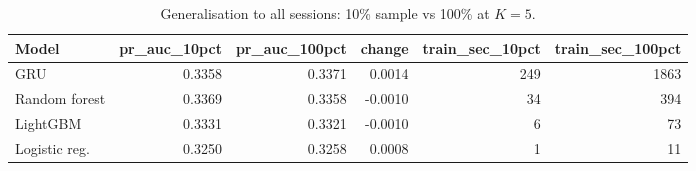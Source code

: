 \begin{table}[t]
\centering
\caption{Generalisation to all sessions: 10\% sample vs 100\% at $K=5$.}
\label{tab:scale}
\footnotesize
\begin{tabular}{lrrrrr}
\toprule
Model & pr\_auc\_10pct & pr\_auc\_100pct & change & train\_sec\_10pct & train\_sec\_100pct \\
\midrule
GRU & 0.3358 & 0.3371 & 0.0014 & 249 & 1863 \\
Random forest & 0.3369 & 0.3358 & -0.0010 & 34 & 394 \\
LightGBM & 0.3331 & 0.3321 & -0.0010 & 6 & 73 \\
Logistic reg. & 0.3250 & 0.3258 & 0.0008 & 1 & 11 \\
\bottomrule
\end{tabular}
\end{table}
